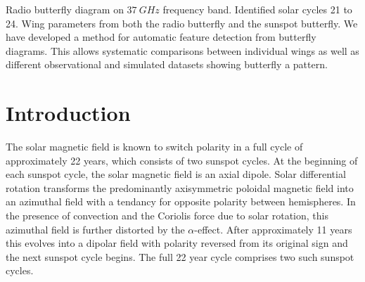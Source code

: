\documentclass{aa}
\begin{document}
  {
    Radio butterfly diagram on $\SI{37}{GHz}$ frequency band.
    Identified solar cycles 21 to 24.
    Wing parameters from both the radio butterfly and the sunspot butterfly.
  }
  {
    We have developed a method for automatic feature detection from butterfly
    diagrams.
    This allows systematic comparisons between individual wings as well as
    different observational and simulated datasets showing butterfly a pattern.
  }


  \maketitle

\section{Introduction}


  The solar magnetic field is known to switch polarity in a full cycle of 
  approximately %
  22 years, which consists of two sunspot cycles.
  At %
  the beginning of each sunspot cycle, the solar magnetic field is an axial
  dipole.
  Solar differential rotation transforms the predominantly axisymmetric
  poloidal magnetic field into an azimuthal field with a tendancy for opposite
  polarity between hemispheres.
  In the presence of convection and the Coriolis force due to solar rotation,
  this azimuthal field is further distorted by the $\alpha$-effect.
  After approximately 11 years this evolves into a dipolar field with
  polarity reversed from its original sign
  and the next sunspot cycle begins.
  The full 22 year cycle comprises two such sunspot cycles.
\end{document}
